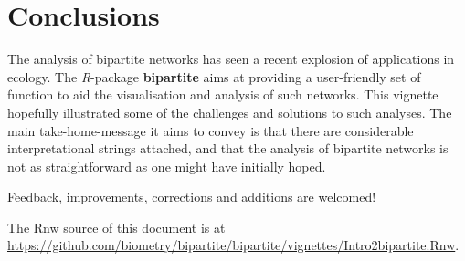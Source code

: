 \documentclass[a4paper, 11pt]{article}
\newcommand{\package}[1]{\textbf{#1}}
\newcommand{\proglang}[1]{\textsl{#1}}
\begin{document}
\section*{Conclusions}%
The analysis of bipartite networks has seen a recent explosion of applications in ecology. The \proglang{R}-package \package{bipartite} aims at providing a user-friendly set of function to aid the visualisation and analysis of such networks. This vignette hopefully illustrated some of the  challenges and solutions to such analyses. The main take-home-message it aims to convey is that there are considerable interpretational strings attached, and that the analysis of bipartite networks is not as straightforward as one might have initially hoped.

\medskip
\noindent Feedback, improvements, corrections and additions are welcomed!







\bigskip

The Rnw source of this document is at \url{https://github.com/biometry/bipartite/bipartite/vignettes/Intro2bipartite.Rnw}.

\setlength{\bibsep}{0cm}
\def\bibfont{\small}



\printindex
\end{document}
